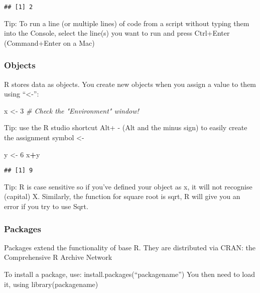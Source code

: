 \documentclass[
]{article}
\newenvironment{Shaded}{\begin{snugshade}}{\end{snugshade}}
\newcommand{\CommentTok}[1]{\textcolor[rgb]{0.56,0.35,0.01}{\textit{#1}}}
\newcommand{\DecValTok}[1]{\textcolor[rgb]{0.00,0.00,0.81}{#1}}
\newcommand{\NormalTok}[1]{#1}
\newcommand{\OtherTok}[1]{\textcolor[rgb]{0.56,0.35,0.01}{#1}}
\newcommand{\SpecialCharTok}[1]{\textcolor[rgb]{0.81,0.36,0.00}{\textbf{#1}}}
\begin{document}
\begin{verbatim}
## [1] 2
\end{verbatim}

Tip: To run a line (or multiple lines) of code from a script without
typing them into the Console, select the line(s) you want to run and
press Ctrl+Enter (Command+Enter on a Mac)

\subsubsection{Objects}\label{objects}

R stores data as objects. You create new objects when you assign a value
to them using ``\textless-'':

\begin{Shaded}
\begin{Highlighting}[]
\NormalTok{x }\OtherTok{\textless{}{-}} \DecValTok{3}  \CommentTok{\# Check the "Environment" window!}
\end{Highlighting}
\end{Shaded}

Tip: use the R studio shortcut Alt+ - (Alt and the minus sign) to easily
create the assignment symbol \textless-

\begin{Shaded}
\begin{Highlighting}[]
\NormalTok{y }\OtherTok{\textless{}{-}} \DecValTok{6}
\NormalTok{x}\SpecialCharTok{+}\NormalTok{y}
\end{Highlighting}
\end{Shaded}

\begin{verbatim}
## [1] 9
\end{verbatim}

Tip: R is case sensitive so if you've defined your object as x, it will
not recognise (capital) X. Similarly, the function for square root is
sqrt, R will give you an error if you try to use Sqrt.

\subsubsection{Packages}\label{packages}

Packages extend the functionality of base R. They are distributed via
CRAN: the Comprehensive R Archive Network

To install a package, use: install.packages(``packagename'') You then
need to load it, using library(packagename)
\end{document}
